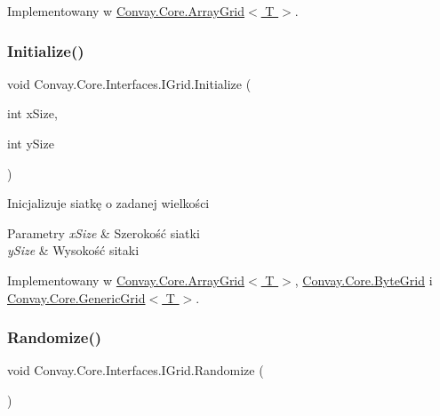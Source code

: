 Implementowany w \hyperlink{class_convay_1_1_core_1_1_array_grid_a90fc10f845bf94f334079751fc9c1cba}{Convay.\+Core.\+Array\+Grid$<$ T $>$}.

\hypertarget{interface_convay_1_1_core_1_1_interfaces_1_1_i_grid_a405c8dd71debf227ef90365d7fdf52b2}{}\label{interface_convay_1_1_core_1_1_interfaces_1_1_i_grid_a405c8dd71debf227ef90365d7fdf52b2} 
\subsubsection{\texorpdfstring{Initialize()}{Initialize()}}
{\footnotesize\ttfamily void Convay.\+Core.\+Interfaces.\+I\+Grid.\+Initialize (\begin{DoxyParamCaption}\item[{int}]{x\+Size,  }\item[{int}]{y\+Size }\end{DoxyParamCaption})}



Inicjalizuje siatkę o zadanej wielkości 


\begin{DoxyParams}{Parametry}
{\em x\+Size} & Szerokość siatki\\
\hline
{\em y\+Size} & Wysokość sitaki\\
\hline
\end{DoxyParams}


Implementowany w \hyperlink{class_convay_1_1_core_1_1_array_grid_a49501f55af9f747ed75cb94563b6d641}{Convay.\+Core.\+Array\+Grid$<$ T $>$}, \hyperlink{class_convay_1_1_core_1_1_byte_grid_a75128576734ebd27f9b469ed0f7aaeee}{Convay.\+Core.\+Byte\+Grid} i \hyperlink{class_convay_1_1_core_1_1_generic_grid_a5d39ff67bb67b6a70455ecd61fc1a0ef}{Convay.\+Core.\+Generic\+Grid$<$ T $>$}.

\hypertarget{interface_convay_1_1_core_1_1_interfaces_1_1_i_grid_aee7beb6eae4302772adf85ecfc26b756}{}\label{interface_convay_1_1_core_1_1_interfaces_1_1_i_grid_aee7beb6eae4302772adf85ecfc26b756} 
\subsubsection{\texorpdfstring{Randomize()}{Randomize()}}
{\footnotesize\ttfamily void Convay.\+Core.\+Interfaces.\+I\+Grid.\+Randomize (\begin{DoxyParamCaption}{ }\end{DoxyParamCaption})}



